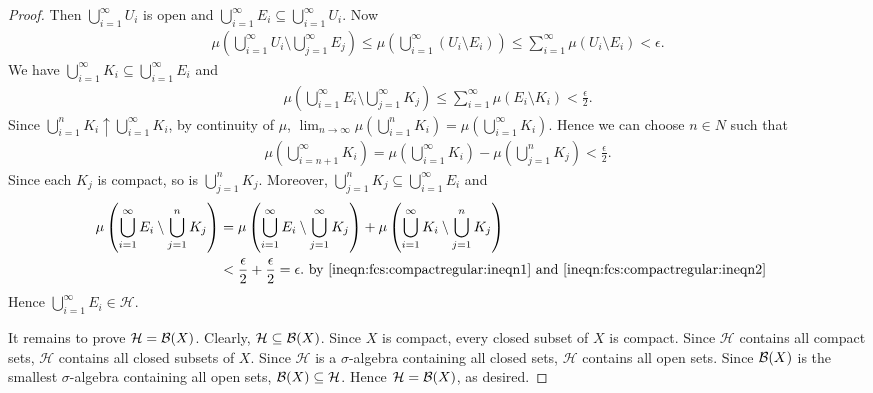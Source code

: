 \begin{definition}
\begin{proof}
    Then $\bigcup_{i = 1}^{\infty} U_i$ is open and $\bigcup_{i = 1}^{\infty} E_i \subseteq \bigcup_{i = 1}^{\infty} U_i$. Now \begin{align*}
        \mu \left ( \bigcup_{i=1}^\infty U_i \setminus \bigcup_{j=1}^\infty E_j \right) \leq \mu \left(\bigcup_{i=1}^\infty (U_i \setminus E_i) \right) \leq \sum_{i = 1}^\infty \mu (U_i \setminus E_i) < \epsilon. 
    \end{align*}
    We have $\bigcup_{i = 1}^{\infty} K_i \subseteq \bigcup_{i = 1}^{\infty} E_i$ and \begin{align}
        \label{ineqn:fcs:compactregular:ineqn1}
        \mu \left (\bigcup_{i = 1}^{\infty} E_i \setminus \bigcup_{j = 1}^{\infty} K_j \right) \leq  \sum_{i = 1}^{\infty} \mu \left ( E_i \setminus K_i \right ) < \frac{\epsilon}{2}.
    \end{align}
    Since $\bigcup_{i = 1}^n K_i \uparrow \bigcup_{i = 1}^\infty K_i$, by continuity of $\mu$, $\lim_{n \to \infty} \mu (\bigcup_{i = 1}^n K_i) = \mu (\bigcup_{i = 1}^\infty K_i)$. Hence we can choose $n \in N$ such that \begin{align}
        \label{ineqn:fcs:compactregular:ineqn2}
        \mu \left (\bigcup_{i = n + 1}^{\infty} K_i \right) =  \mu \left (\bigcup_{i = 1}^{\infty} K_i \right) -  \mu \left (\bigcup_{j = 1}^{n} K_j \right) < \frac{\epsilon}{2}.
    \end{align}
    Since each $K_j$ is compact, so is $\bigcup_{j = 1}^n K_j$. Moreover, $\bigcup_{j = 1}^n K_j \subseteq \bigcup_{i = 1}^\infty E_i$ and \begin{align*}
        \mu \left (\bigcup_{i=1}^\infty E_i \setminus \bigcup_{j =1}^{n} K_j \right) &=  \mu \left (\bigcup_{i=1}^\infty E_i \setminus \bigcup_{j = 1}^{\infty} K_j \right) +  \mu \left (\bigcup_{i=1}^\infty K_i \setminus \bigcup_{j = 1}^{n} K_j \right) &  \\
            & < \frac{\epsilon}{2} +  \frac{\epsilon}{2}  = \epsilon. \text{    }   \text{by \ref{ineqn:fcs:compactregular:ineqn1} and \ref{ineqn:fcs:compactregular:ineqn2}}
    \end{align*}
    Hence $\bigcup_{i = 1}^{\infty} E_i \in \mathcal{H}$.
    
    It remains to prove $\mathcal{H} = {\mathcal B}(X)$. Clearly, $\mathcal{H} \subseteq {\mathcal B}(X)$. Since $X$ is compact, every closed subset of $X$ is compact. Since $\mathcal{H}$ contains all compact sets, $\mathcal{H}$ contains all closed subsets of $X$. Since $\mathcal{H}$ is a $\sigma$-algebra containing all closed sets, $\mathcal{H}$ contains all open sets. Since ${\mathcal B}(X)$ is the smallest $\sigma$-algebra containing all open sets, ${\mathcal B}(X) \subseteq \mathcal{H}$. Hence $\mathcal{H} = {\mathcal B}(X)$, as desired.
\end{proof}


\end{definition}
